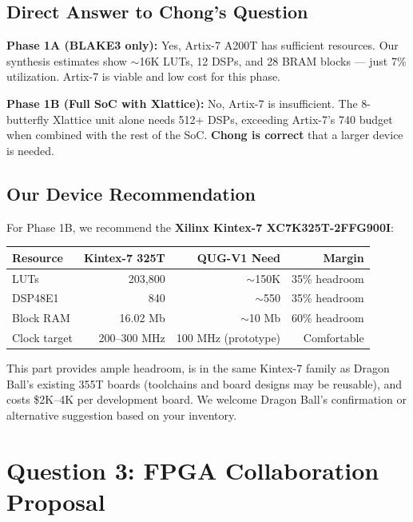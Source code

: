 \documentclass[11pt,a4paper]{article}
\begin{document}
\subsection{Direct Answer to Chong's Question}

\textbf{Phase 1A (BLAKE3 only):} Yes, Artix-7 A200T has sufficient resources. Our synthesis estimates show $\sim$16K LUTs, 12 DSPs, and 28 BRAM blocks --- just 7\% utilization. Artix-7 is viable and low cost for this phase.

\textbf{Phase 1B (Full SoC with Xlattice):} No, Artix-7 is insufficient. The 8-butterfly Xlattice unit alone needs 512+ DSPs, exceeding Artix-7's 740 budget when combined with the rest of the SoC. \textbf{Chong is correct} that a larger device is needed.

\subsection{Our Device Recommendation}

For Phase 1B, we recommend the \textbf{Xilinx Kintex-7 XC7K325T-2FFG900I}:

\begin{center}
\begin{tabular}{@{}lrrr@{}}
\toprule
\textbf{Resource} & \textbf{Kintex-7 325T} & \textbf{QUG-V1 Need} & \textbf{Margin} \\
\midrule
LUTs & 203,800 & $\sim$150K & 35\% headroom \\
DSP48E1 & 840 & $\sim$550 & 35\% headroom \\
Block RAM & 16.02 Mb & $\sim$10 Mb & 60\% headroom \\
Clock target & 200--300 MHz & 100 MHz (prototype) & Comfortable \\
\bottomrule
\end{tabular}
\end{center}

This part provides ample headroom, is in the same Kintex-7 family as Dragon Ball's existing 355T boards (toolchains and board designs may be reusable), and costs \$2K--4K per development board. We welcome Dragon Ball's confirmation or alternative suggestion based on your inventory.

\section{Question 3: FPGA Collaboration Proposal}
\end{document}
